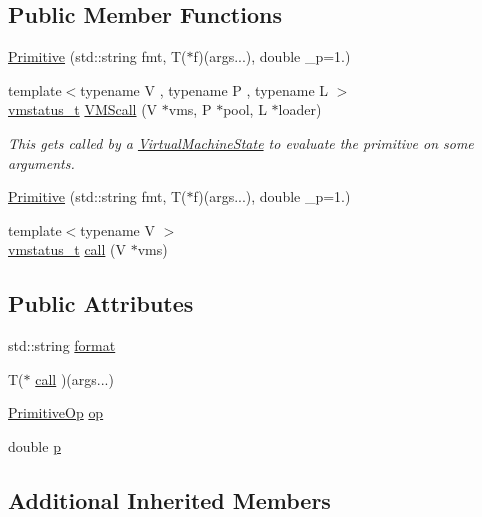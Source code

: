 \subsection*{Public Member Functions}
\begin{DoxyCompactItemize}
\item 
\hyperlink{struct_primitive_a4303c3567a7bb2921d298f48b07b0add}{Primitive} (std\+::string fmt, T($\ast$f)(args...), double \+\_\+p=1.)
\item 
{\footnotesize template$<$typename V , typename P , typename L $>$ }\\\hyperlink{_instruction_8h_a6202215407ab29590bb936ca2996cf64}{vmstatus\+\_\+t} \hyperlink{struct_primitive_a10cedec90ed4a3ff01be2bd3b9c36528}{V\+M\+Scall} (V $\ast$vms, P $\ast$pool, L $\ast$loader)
\begin{DoxyCompactList}\small\item\em This gets called by a \hyperlink{class_virtual_machine_state}{Virtual\+Machine\+State} to evaluate the primitive on some arguments. \end{DoxyCompactList}\item 
\hyperlink{struct_primitive_a4303c3567a7bb2921d298f48b07b0add}{Primitive} (std\+::string fmt, T($\ast$f)(args...), double \+\_\+p=1.)
\item 
{\footnotesize template$<$typename V $>$ }\\\hyperlink{_instruction_8h_a6202215407ab29590bb936ca2996cf64}{vmstatus\+\_\+t} \hyperlink{struct_primitive_aa776657a1c5101422799c33a8d2cfaef}{call} (V $\ast$vms)
\end{DoxyCompactItemize}
\subsection*{Public Attributes}
\begin{DoxyCompactItemize}
\item 
std\+::string \hyperlink{struct_primitive_afa8c2d4087b36ae9580fed3dc00e47b6}{format}
\item 
T($\ast$ \hyperlink{struct_primitive_a31a16d23d239e574ba4e47f6b8e41a9d}{call} )(args...)
\item 
\hyperlink{_instruction_8h_a227278394efd1e2313c727102db09ea9}{Primitive\+Op} \hyperlink{struct_primitive_a45ef953a37468a97b5a4b5531e5f21ce}{op}
\item 
double \hyperlink{struct_primitive_a43fac47ebf8ec63a70443d80dcd04687}{p}
\end{DoxyCompactItemize}
\subsection*{Additional Inherited Members}


